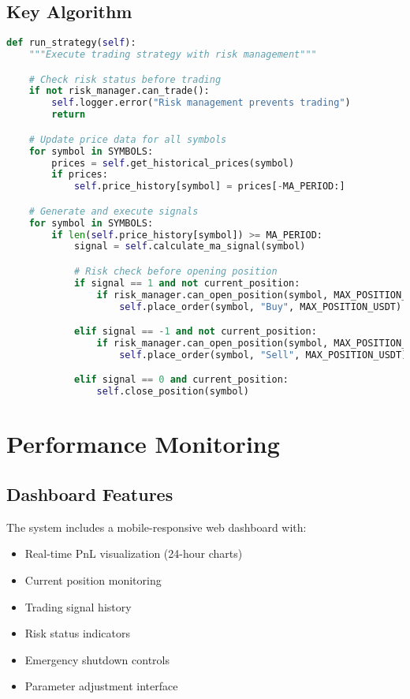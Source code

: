 \documentclass[12pt,a4paper]{article}
\begin{document}
\subsection{Key Algorithm}

\begin{lstlisting}[language=Python, caption=Main Strategy Logic]
def run_strategy(self):
    """Execute trading strategy with risk management"""

    # Check risk status before trading
    if not risk_manager.can_trade():
        self.logger.error("Risk management prevents trading")
        return

    # Update price data for all symbols
    for symbol in SYMBOLS:
        prices = self.get_historical_prices(symbol)
        if prices:
            self.price_history[symbol] = prices[-MA_PERIOD:]

    # Generate and execute signals
    for symbol in SYMBOLS:
        if len(self.price_history[symbol]) >= MA_PERIOD:
            signal = self.calculate_ma_signal(symbol)

            # Risk check before opening position
            if signal == 1 and not current_position:
                if risk_manager.can_open_position(symbol, MAX_POSITION_USDT):
                    self.place_order(symbol, "Buy", MAX_POSITION_USDT)

            elif signal == -1 and not current_position:
                if risk_manager.can_open_position(symbol, MAX_POSITION_USDT):
                    self.place_order(symbol, "Sell", MAX_POSITION_USDT)

            elif signal == 0 and current_position:
                self.close_position(symbol)
\end{lstlisting}

\section{Performance Monitoring}

\subsection{Dashboard Features}
The system includes a mobile-responsive web dashboard with:

\begin{itemize}
\item Real-time PnL visualization (24-hour charts)
\item Current position monitoring
\item Trading signal history
\item Risk status indicators
\item Emergency shutdown controls
\item Parameter adjustment interface
\end{itemize}
\end{document}
